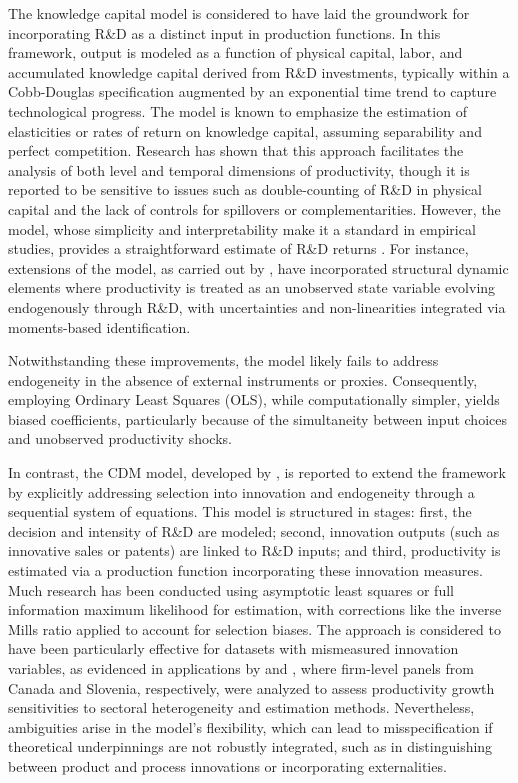\documentclass[a4paper, 12pt]{article}
\begin{document}
The \textcite{griliches1979issues} knowledge capital model is considered to have laid the groundwork for incorporating R\&D as a distinct input in production functions. In this framework, output is modeled as a function of physical capital, labor, and accumulated knowledge capital derived from R\&D investments, typically within a Cobb-Douglas specification augmented by an exponential time trend to capture technological progress. The model is known to emphasize the estimation of elasticities or rates of return on knowledge capital, assuming separability and perfect competition. Research has shown that this approach facilitates the analysis of both level and temporal dimensions of productivity, though it is reported to be sensitive to issues such as double-counting of R\&D in physical capital and the lack of controls for spillovers or complementarities. However, the \textcite{griliches1979issues} model, whose simplicity and interpretability make it a standard in empirical studies, provides a straightforward estimate of R\&D returns \parencite{andersen2019knowledge}. For instance, extensions of the \textcite{griliches1979issues} model, as carried out by \textcite{doraszelski2013r}, have incorporated structural dynamic elements where productivity is treated as an unobserved state variable evolving endogenously through R\&D, with uncertainties and non-linearities integrated via moments-based identification. 

Notwithstanding these improvements, the model likely fails to address endogeneity in the absence of external instruments or proxies. Consequently, employing Ordinary Least Squares (OLS), while computationally simpler, yields biased coefficients, particularly because of the simultaneity between input choices and unobserved productivity shocks.

In contrast, the CDM model, developed by \textcite{crepon1998research}, is reported to extend the \textcite{griliches1979issues} framework by explicitly addressing selection into innovation and endogeneity through a sequential system of equations. This model is structured in stages: first, the decision and intensity of R\&D are modeled; second, innovation outputs (such as innovative sales or patents) are linked to R\&D inputs; and third, productivity is estimated via a production function incorporating these innovation measures. Much research has been conducted using asymptotic least squares or full information maximum likelihood for estimation, with corrections like the inverse Mills ratio applied to account for selection biases. The \textcite{crepon1998research} approach is considered to have been particularly effective for datasets with mismeasured innovation variables, as evidenced in applications by \textcite{therrien2009innovation} and \textcite{damijan2010innovation}, where firm-level panels from Canada and Slovenia, respectively, were analyzed to assess productivity growth sensitivities to sectoral heterogeneity and estimation methods. Nevertheless, ambiguities arise in the model's flexibility, which can lead to misspecification if theoretical underpinnings are not robustly integrated, such as in distinguishing between product and process innovations or incorporating externalities.
\end{document}
